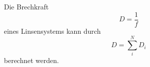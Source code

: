     \noindent Die Brechkraft
    \begin{equation}
        \label{eqn:Brechkraft}
        D=\frac{1}{f}
    \end{equation}
    eines Linsensystems kann durch
    \begin{equation}
        D=\sum_i^N{D_i}
        \label{eqn:Brechkraft2}
    \end{equation}
    berechnet werden.

    \cite{V408}

